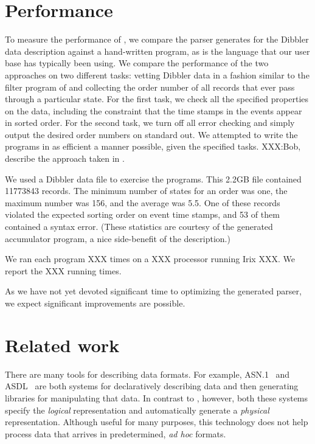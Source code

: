 \documentclass{sig-alternate}
\begin{document}
\section{Performance}
To measure the performance of \pads{}, we compare the parser \pads{} generates for the Dibbler data description against a hand-written \perl{} program, as \perl{} is the language that our user base has typically been using. We compare the performance of the two approaches on two different tasks: vetting Dibbler data in a fashion similar to the filter program of
 and collecting the order number of all records that ever pass through a particular state.  For the first task, we check all the specified properties on the data, including the constraint that the time stamps in the events appear in sorted order.  For the second task, we turn off all error checking and simply output the desired order numbers on standard out.
We attempted to write the \perl{} programs in as efficient a manner possible, given the specified tasks.  XXX:Bob, describe the approach taken in \perl{}.

We used a Dibbler data file to exercise the programs.  This 2.2GB file contained 11773843 records.  The minimum number of states for an order was one, the maximum number was 156, and the average was 5.5.  One of these records violated the expected sorting order on event time stamps, and 53 of them contained a syntax error.
(These statistics are courtesy of the generated \pads{} accumulator program, a nice side-benefit of the \pads{} description.)  

We ran each program XXX times on a XXX processor running Irix XXX.   We report the XXX running times.


As
we have not yet devoted significant time to optimizing the generated parser,
we expect significant improvements are possible.

\section{Related work}
There are many tools for describing data formats. For example,
\textsc{ASN.1}~\cite{asn} and \textsc{ASDL}~\cite{asdl} are both
systems for declaratively describing data and then generating
libraries for manipulating that data.  In contrast to \pads{},
however, both these systems specify the {\em logical\/} representation
and automatically generate a {\em physical\/} representation.
Although useful for many purposes, this technology does not help
process data that arrives in predetermined, \textit{ad hoc} formats.
\end{document}

